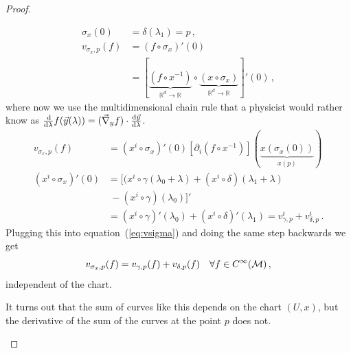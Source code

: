 \documentclass[11pt, a4paper, twocolumn]{article} %
\begin{document}
\begin{proof}
\begin{itemize}
\begin{align}
                \sigma_x(0) &= \delta(\lambda_1) = p\,,\\
                v_{\sigma_x, p}(f) &= (f\circ\sigma_x)'(0)\label{eq:vsigma}\\
                &= \left[ \underbrace{(f\circ x^{-1})}_{\mathbb{R}^d\to\mathbb{R}}\circ\underbrace{(x\circ\sigma_x)}_{\mathbb{R}^d\to\mathbb{R}} \right]'(0)\nonumber\,,
            \end{align}
            where now we use the multidimensional chain rule that a physicist would rather know as
            $\frac{\operatorname{d\!}}{\operatorname{d\!} \lambda}f(\vec{y}(\lambda))
            = (\vec{\nabla}_{y} f)\cdot \frac{\operatorname{d\!} \vec{y}}{\operatorname{d\!}\lambda}$.
            \begin{align*}
                v_{\sigma_x,p}(f) &= (x^i\circ\sigma_x)'(0)\left[\partial_i(f\circ x^{-1})\right]
                (\underbrace{x(\sigma_x(0))}_{x(p)})\\
                (x^i\circ\sigma_x)'(0) &=[(x^i\circ\gamma(\lambda_0+\lambda) + (x^i\circ\delta)(\lambda_1+\lambda)\\ 
                &~- (x^i\circ\gamma)(\lambda_0)]'\\
                &= (x^i\circ\gamma)'(\lambda_0) + (x^i\circ\delta)'(\lambda_1) = v^i_{\gamma,p} + v^i_{\delta,p}\,.
            \end{align*}
            Plugging this into equation~(\ref{eq:vsigma}) and doing the same step backwards we get
            \begin{equation}
                v_{\sigma_x, p}(f) = v_{\gamma,p}(f) + v_{\delta, p}(f)\quad\forall f\in C^\infty(\mathcal{M})\,,
            \end{equation}
            independent of the chart.
    \end{itemize}
    \begin{note}
        It turns out that the sum of curves like this depends on the chart $(U, x)$, but the derivative
        of the sum of the curves at the point $p$ does not.
    \end{note}
\end{proof}
    
\end{document}
